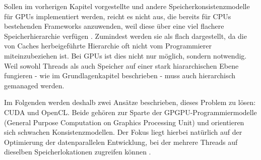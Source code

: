 \documentclass[final,bibliography=totocnumbered]{include/sikseminar}
\begin{document}
Sollen im vorherigen Kapitel vorgestellte und andere Speicherkonsistenzmodelle für GPUs implementiert werden,
reicht es nicht aus, die bereits für CPUs bestehenden Frameworks anzuwenden, weil diese über eine viel flachere Speicherhierarchie verfügen \cite{gpucc}.
Zumindest werden sie als flach dargestellt, da die von Caches herbeigeführte Hierarchie oft nicht vom Programmierer miteinzubeziehen ist.
Bei GPUs ist dies nicht nur möglich, sondern notwendig. Weil sowohl Threads als auch Speicher auf einer stark hiararchischen Ebene fungieren - wie im Grundlagenkapitel beschrieben -%
muss auch hierarchisch gemanaged werden.

Im Folgenden werden deshalb zwei Ansätze beschrieben, dieses Problem zu lösen: CUDA und OpenCL.
Beide gehören zur Sparte der GPGPU-Programmiermodelle (General Purpose Computation on Graphics Processing Unit) und orientieren sich schwachen Konsistenzmodellen. Der Fokus liegt hierbei natürlich auf der Optimierung der datenparallelen Entwicklung, bei der mehrere Threads auf dieselben Speicherlokationen zugreifen können \cite{optim}.
\end{document}
